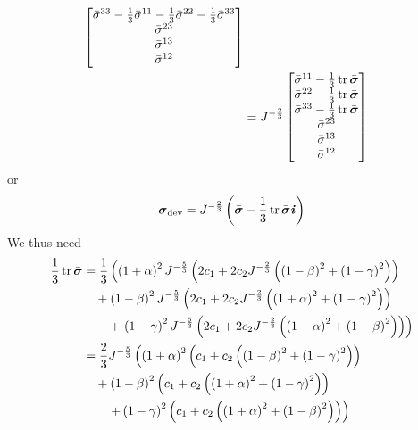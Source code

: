 \begin{equation}
\begin{split}
\begin{bmatrix}
      \bar{\sigma}^{33}-\frac{1}{3}\bar{\sigma}^{11}-\frac{1}{3}\bar{\sigma}^{22}-\frac{1}{3}\bar{\sigma}^{33} \\
      \bar{\sigma}^{23} \\
      \bar{\sigma}^{13} \\
      \bar{\sigma}^{12} 
    \end{bmatrix} \\
    &=J^{-\frac{2}{3}}\begin{bmatrix}
      \bar{\sigma}^{11}-\frac{1}{3}\trace{}{\bar{\tensor{\sigma}}} \\
      \bar{\sigma}^{22}-\frac{1}{3}\trace{}{\bar{\tensor{\sigma}}} \\
      \bar{\sigma}^{33}-\frac{1}{3}\trace{}{\bar{\tensor{\sigma}}} \\
      \bar{\sigma}^{23} \\
      \bar{\sigma}^{13} \\
      \bar{\sigma}^{12}
    \end{bmatrix}
  \end{split}
\end{equation}
or
\begin{equation}
  \tensor{\sigma}_{\devop}=J^{-\frac{2}{3}}\pbrac{\bar{\tensor{\sigma}}-\frac{1}{3}\trace{}{\bar{\tensor{\sigma}}}\tensor{i}}
\end{equation}
We thus need
\begin{equation}
  \begin{split}
    \frac{1}{3}\trace{}{\bar{\tensor{\sigma}}}&=\frac{1}{3}\left(\pbrac{1+\alpha}^{2}J^{-\frac{5}{3}}\pbrac{2c_{1}+2c_{2}J^{-\frac{2}{3}}\pbrac{\pbrac{1-\beta}^{2}+\pbrac{1-\gamma}^{2}}}\right.\\
    &\quad+\pbrac{1-\beta}^{2}J^{-\frac{5}{3}}\pbrac{2c_{1}+2c_{2}J^{-\frac{2}{3}}\pbrac{\pbrac{1+\alpha}^{2}+\pbrac{1-\gamma}^{2}}}\\
    &\quad\quad+\left.\pbrac{1-\gamma}^{2}J^{-\frac{5}{3}}\pbrac{2c_{1}+2c_{2}J^{-\frac{2}{3}}\pbrac{\pbrac{1+\alpha}^{2}+\pbrac{1-\beta}^{2}}}\right)\\
    &=\dfrac{2}{3}J^{-\frac{5}{3}}\left(\pbrac{1+\alpha}^{2}\pbrac{c_{1}+c_{2}\pbrac{\pbrac{1-\beta}^{2}+\pbrac{1-\gamma}^{2}}}\right.\\
    &\quad+\pbrac{1-\beta}^{2}\pbrac{c_{1}+c_{2}\pbrac{\pbrac{1+\alpha}^{2}+\pbrac{1-\gamma}^{2}}}\\
    &\quad\quad\left.+\pbrac{1-\gamma}^{2}\pbrac{c_{1}+c_{2}\pbrac{\pbrac{1+\alpha}^{2}+\pbrac{1-\beta}^{2}}}\right)
  \end{split}
\end{equation}
